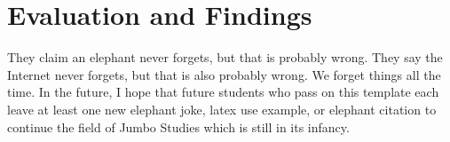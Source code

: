 \chapter{Evaluation and Findings}  
\label{chapter:chapter4}

They claim an elephant never forgets, but that is probably wrong. They
say the Internet never forgets, but that is also probably wrong. We
forget things all the time. In the future, I hope that future students
who pass on this template each leave at least one new elephant joke,
latex use example, or elephant citation to continue the field of Jumbo
Studies which is still in its infancy.



